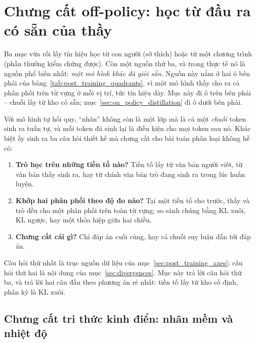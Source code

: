 
\section{Chưng cất off-policy: học từ đầu ra có sẵn của thầy}
\label{sec:llm_distillation}

Ba mục vừa rồi lấy tín hiệu học từ con người (sở thích) hoặc từ một chương trình (phần thưởng kiểm chứng được). Còn một nguồn thứ ba, và trong thực tế nó là nguồn phổ biến nhất: \emph{một mô hình khác đã giỏi sẵn}. Nguồn này nằm ở hai ô bên phải của bảng~\ref{tab:post_training_quadrants}, vì một mô hình thầy cho ra cả phân phối trên từ vựng ở mỗi vị trí, tức tín hiệu dày. Mục này đi ô trên bên phải -- chuỗi lấy từ kho có sẵn; mục~\ref{sec:on_policy_distillation} đi ô dưới bên phải.

Với mô hình tự hồi quy, ``nhãn'' không còn là một lớp mà là cả một \emph{chuỗi} token sinh ra tuần tự, và mỗi token đã sinh lại là điều kiện cho mọi token sau nó. Khác biệt ấy sinh ra ba câu hỏi thiết kế mà chưng cất cho bài toán phân loại không hề có:
\begin{enumerate}
	\item \textbf{Trò học trên những tiền tố nào?} Tiền tố lấy từ văn bản người viết, từ văn bản thầy sinh ra, hay từ chính văn bản trò đang sinh ra trong lúc huấn luyện.
	\item \textbf{Khớp hai phân phối theo độ đo nào?} Tại một tiền tố cho trước, thầy và trò đều cho một phân phối trên toàn từ vựng; so sánh chúng bằng KL xuôi, KL ngược, hay một thỏa hiệp giữa hai chiều.
	\item \textbf{Chưng cất cái gì?} Chỉ đáp án cuối cùng, hay cả chuỗi suy luận dẫn tới đáp án.
\end{enumerate}

Câu hỏi thứ nhất là trục nguồn dữ liệu của mục~\ref{sec:post_training_axes}; câu hỏi thứ hai là nội dung của mục~\ref{sec:divergences}. Mục này trả lời câu hỏi thứ ba, và trả lời hai câu đầu theo phương án rẻ nhất: tiền tố lấy từ kho cố định, phân kỳ là KL xuôi.

\subsection{Chưng cất tri thức kinh điển: nhãn mềm và nhiệt độ}
\label{ssec:knowledge_distillation}

